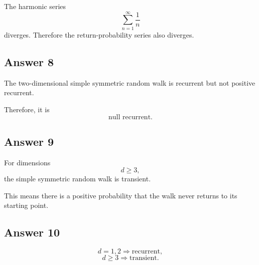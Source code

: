 \documentclass[12pt,a4paper]{article}
\theoremstyle{notestyle}
\begin{document}
The harmonic series
\[
\sum_{n=1}^{\infty}\frac1n
\]
diverges. Therefore the return-probability series also diverges.

\subsection*{Answer 8}

The two-dimensional simple symmetric random walk is recurrent but not positive recurrent.

Therefore, it is
\[
\boxed{\text{null recurrent}.}
\]

\subsection*{Answer 9}

For dimensions
\[
d\geq3,
\]
the simple symmetric random walk is transient.

This means there is a positive probability that the walk never returns to its starting point.

\subsection*{Answer 10}

\[
d=1,2 \Rightarrow \text{recurrent},
\]
\[
d\geq3 \Rightarrow \text{transient}.
\]
\end{document}
